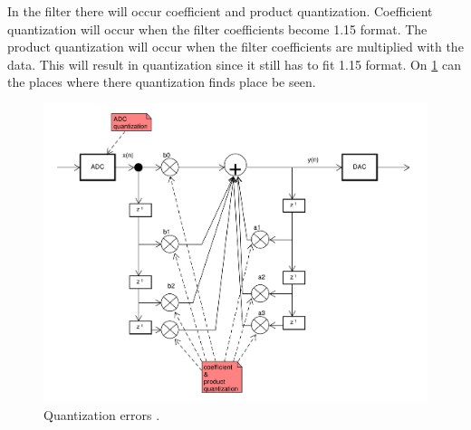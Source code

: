 In the filter there will occur coefficient and product quantization. Coefficient quantization will occur when the filter coefficients become 1.15 format. The product quantization will occur when the filter coefficients are multiplied with the data. This will result in quantization since it still has to fit 1.15 format. On \cref{fig:quant_error} can the places where there quantization finds place be seen. 
\begin{figure}
	\centering
	\includegraphics[width=1\linewidth]{gfx/Design/flow_quant_error.pdf}
	\caption{Quantization errors \systemName.}
	\label{fig:quant_error}
\end{figure}


\FloatBarrier